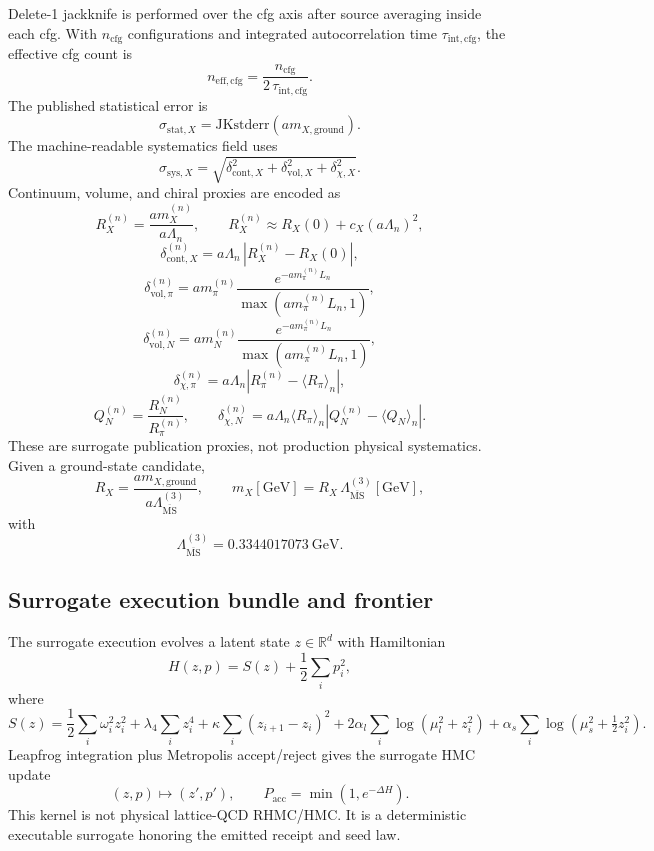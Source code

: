 \documentclass[11pt]{article}
\begin{document}
Delete-1 jackknife is performed over the cfg axis after source averaging inside each cfg. With
\(n_{\mathrm{cfg}}\) configurations and integrated autocorrelation time
\(\tau_{\mathrm{int},\mathrm{cfg}}\), the effective cfg count is
\[
n_{\mathrm{eff},\mathrm{cfg}}
=
\frac{n_{\mathrm{cfg}}}{2\,\tau_{\mathrm{int},\mathrm{cfg}}}.
\]
The published statistical error is
\[
\sigma_{\mathrm{stat},X}
=
\mathrm{JKstderr}(a m_{X,\mathrm{ground}}).
\]
The machine-readable systematics field uses
\[
\sigma_{\mathrm{sys},X}
=
\sqrt{
\delta_{\mathrm{cont},X}^2
+
\delta_{\mathrm{vol},X}^2
+
\delta_{\chi,X}^2
}.
\]
Continuum, volume, and chiral proxies are encoded as
\[
R_X^{(n)} = \frac{a m_X^{(n)}}{a\Lambda_n},
\qquad
R_X^{(n)} \approx R_X(0) + c_X (a\Lambda_n)^2,
\]
\[
\delta_{\mathrm{cont},X}^{(n)}
=
a\Lambda_n\,\left|R_X^{(n)} - R_X(0)\right|,
\]
\[
\delta_{\mathrm{vol},\pi}^{(n)}
=
a m_\pi^{(n)}
\frac{e^{-a m_\pi^{(n)}L_n}}{\max(a m_\pi^{(n)}L_n,1)},
\]
\[
\delta_{\mathrm{vol},N}^{(n)}
=
a m_N^{(n)}
\frac{e^{-a m_\pi^{(n)}L_n}}{\max(a m_\pi^{(n)}L_n,1)},
\]
\[
\delta_{\chi,\pi}^{(n)}
=
a\Lambda_n \left|R_\pi^{(n)} - \langle R_\pi\rangle_n\right|,
\]
\[
Q_N^{(n)} = \frac{R_N^{(n)}}{R_\pi^{(n)}},
\qquad
\delta_{\chi,N}^{(n)}
=
a\Lambda_n \langle R_\pi\rangle_n
\left|Q_N^{(n)} - \langle Q_N\rangle_n\right|.
\]
These are surrogate publication proxies, not production physical systematics. Given a
ground-state candidate,
\[
R_X = \frac{a m_{X,\mathrm{ground}}}{a\Lambda_{\overline{\mathrm{MS}}}^{(3)}},
\qquad
m_X[\mathrm{GeV}] = R_X\,\Lambda_{\overline{\mathrm{MS}}}^{(3)}[\mathrm{GeV}],
\]
with
\[
\Lambda_{\overline{\mathrm{MS}}}^{(3)} = 0.3344017073\ \mathrm{GeV}.
\]

\subsection{Surrogate execution bundle and frontier}

The surrogate execution evolves a latent state \(z\in\mathbb{R}^d\) with Hamiltonian
\[
H(z,p) = S(z) + \frac12 \sum_i p_i^2,
\]
where
\[
S(z)
=
\frac12 \sum_i \omega_i^2 z_i^2
+
\lambda_4 \sum_i z_i^4
+
\kappa \sum_i (z_{i+1}-z_i)^2
+
2\alpha_l \sum_i \log(\mu_l^2 + z_i^2)
+
\alpha_s \sum_i \log(\mu_s^2 + \tfrac12 z_i^2).
\]
Leapfrog integration plus Metropolis accept/reject gives the surrogate HMC update
\[
(z,p) \mapsto (z',p'),
\qquad
P_{\mathrm{acc}} = \min(1,e^{-\Delta H}).
\]
This kernel is not physical lattice-QCD RHMC/HMC. It is a deterministic executable surrogate
honoring the emitted receipt and seed law.
\end{document}
